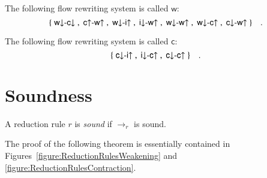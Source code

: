 \newcommand{\frw}{{\mathsf w}}
\begin{definition}\label{definition:FlowRewritingWeakening}
The following flow rewriting system is called $\frw$:
\[
\{\;\rwdcd\;,\;\rcuwu\;,\;\rwdiu\;,\;\ridwu\;,\;\rwdwu\;,\;\rwdcu\;,\;\rcdwu\;\}
\quad.
\]
\end{definition}

\newcommand{\frc}{{\mathsf c}}
\begin{definition}\label{definition:FlowRewritingContraction}
The following flow rewriting system is called $\frc$:
\[
\{\;\rcdiu\;,\;\ridcu\;,\;\rcdcu\;\}\quad.
\]
\end{definition}

\section{Soundness}\label{section:soundness}

\begin{definition}\label{definition:SoundRedcutionRule}
A reduction rule $r$ is \emph{sound} if $\to_r$ is sound.
\end{definition}

The proof of the following theorem is essentially contained in Figures~\vref{figure:ReductionRulesWeakening} and \vref{figure:ReductionRulesContraction}.

